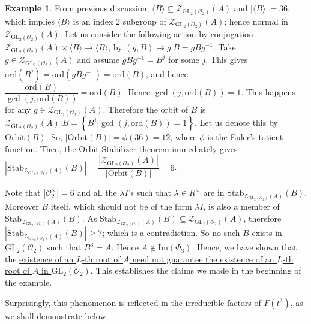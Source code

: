 \documentclass[11pt,twoside]{amsart}
\newcommand{\GL}{\mathrm{GL}}
\newcommand{\im}{\mathrm{Im}}
\newcommand{\R}{\mathscr{O}_2}
\newcommand{\Zen}{\mathscr{Z}}
\theoremstyle{definition} %
\newtheorem{example}[lemma]{Example}
\begin{document}
\begin{example}
From previous discussion, $\langle B\rangle \subseteq \Zen_{\GL_2(\R)}(A) $ and $|\langle B\rangle |=36$, which implies $\langle B\rangle $ is an index $2$ subgroup of $\Zen_{\GL_2(\R)}(A)$; hence normal in $\Zen_{\GL_2(\R)}(A)$. 
Let us consider the following action by conjugation
$\Zen_{\GL_2(\R)}(A) \times \langle B\rangle \longrightarrow \langle B\rangle$, by $(g,B)\mapsto g.B=gBg^{-1}.$
Take $g\in\Zen_{\GL_2(\R)}(A)$ and assume $gBg^{-1}=B^j$ for some $j$.
This gives $\textrm{ord}(B^j)=\textrm{ord}(gBg^{-1})=\textrm{ord}(B)$, and hence 
$\dfrac{\textrm{ord}(B)}{\gcd(j,\textrm{ord}(B))}=\textrm{ord}(B).$ Hence $\gcd(j,\textrm{ord}(B))=1.$
This happens for any $g\in \Zen_{\GL_2(\R)}(A)$.
Therefore the orbit of $B$ is $\Zen_{\GL_2(\R)}(A).B=\left\{B^j| \gcd(j,\textrm{ord}(B))=1\right\}$. 
Let us denote this by $\mathrm{Orbit}(B)$. 
So, $|\mathrm{Orbit}(B)|=\phi(36)=12$, where $\phi$ is the Euler's totient function.
Then, the Orbit-Stabilizer theorem immediately gives $|\mathrm{Stab}_{\Zen_{\GL_2(\R)}(A)}(B)|=\dfrac{|\Zen_{\GL_2(\R)}(A)|}{|\mathrm{Orbit}(B)|}=6$.

Note that $|\R^{\times}|=6$ and all the $\lambda I$'s such that $\lambda\in R^{\times}$ are in $\mathrm{Stab}_{\Zen_{\GL_2(\R)}(A)}(B)$. Moreover $B$ itself, which should not be of the form $\lambda I$, is also a member of $\mathrm{Stab}_{\Zen_{\GL_2(\R)}(A)}(B)$.
As $\mathrm{Stab}_{\Zen_{\GL_2(\R)}(A)}(B)\subseteq \Zen_{\GL_2(\R)}(A) $, therefore $|\mathrm{Stab}_{\Zen_{\GL_2(\R)}(A)}(B)|\geq 7$; which is a contradiction. So no such $B$ exists in $\GL_2(\R)$ such that $B^3=A$. Hence $A\not\in \im(\Phi_3)$. 
Hence, we have shown that the \ul{existence of an $L$-th root of $\overline{A}$ need not guarantee the existence of an $L$-th root of $A$ in $\GL_2(\R)$}. 
This establishes the claims we made in the beginning of the example.
\end{example}
Surprisingly, this phenomenon is reflected in the irreducible factors of $F(t^3)$, as we shall demonstrate below.
\end{document}
